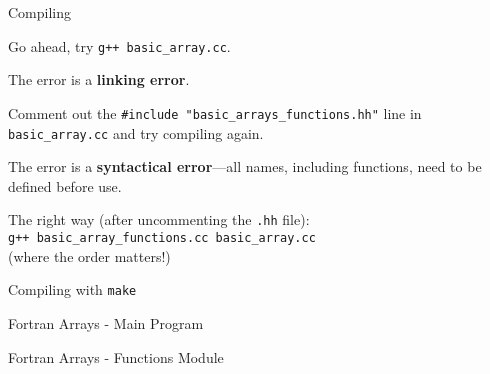 \documentclass[10pt]{beamer}
\begin{document}
\begin{frame}{Compiling}

 Go ahead, try {\tt g++ basic\_array.cc}.

 \pause
 
 \vfill
 The error is a {\bf linking error}.  
 
 \pause 
 
 \vfill
 Comment out the {\tt \#include "basic\_arrays\_functions.hh"} line 
 in {\tt basic\_array.cc} and try compiling again.
 
 \pause 
 \vfill
 The error is a {\bf syntactical error}---all names, including 
 functions, need to be defined before use.
 
 \pause 
 \vfill
 The right way (after uncommenting the {\tt .hh} file): \\
 
 {\tt g++ basic\_array\_functions.cc basic\_array.cc}\\
 
 (where the order matters!)
 
 
\end{frame}

\begin{frame}{Compiling with {\tt make}}
  
\end{frame}

\begin{frame}[allowframebreaks]{Fortran Arrays - Main Program}
 
\end{frame}

\begin{frame}[allowframebreaks]{Fortran Arrays - Functions Module}
 
\end{frame}
\end{document}
